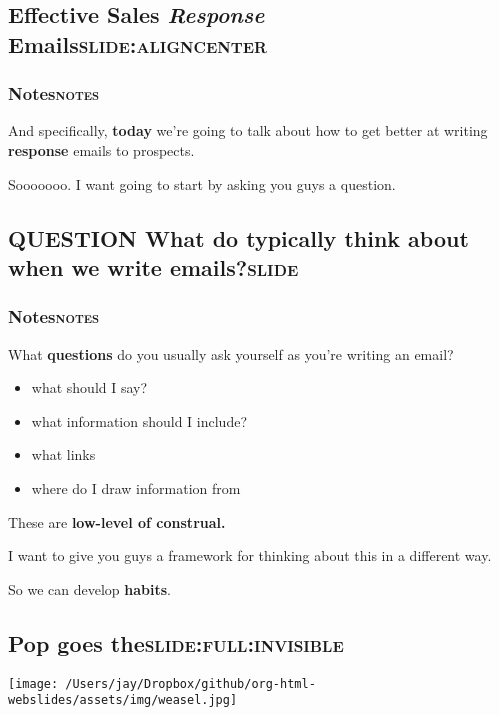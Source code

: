 \documentclass[11pt]{article}
\begin{document}
\subsection{Effective Sales \textit{Response} Emails\hfill{}\textsc{slide:aligncenter}}
\label{sec:org127e529}

\subsubsection{Notes\hfill{}\textsc{notes}}
\label{sec:org4738e1d}
And specifically, \textbf{today} we're going to talk about how to get better at writing \textbf{response} emails to prospects.

Sooooooo. I want going to start by asking you guys a question.

\subsection{{\bfseries\sffamily QUESTION} What do typically think about when we write emails?\hfill{}\textsc{slide}}
\label{sec:orge23fddb}

\subsubsection{Notes\hfill{}\textsc{notes}}
\label{sec:org34065fa}
What \textbf{questions} do you usually ask yourself as you're writing an email?
\begin{itemize}
\item what should I say?
\item what information should I include?
\item what links
\item where do I draw information from
\end{itemize}

These are \textbf{low-level of construal.}

I want to give you guys a framework for thinking about this in a different way.

So we can develop \textbf{habits}.

\subsection{Pop goes the\hfill{}\textsc{slide:full:invisible}}
\label{sec:org19d2053}
\begin{center}
\texttt{[image: /Users/jay/Dropbox/github/org-html-webslides/assets/img/weasel.jpg]}
\end{center}
\end{document}
